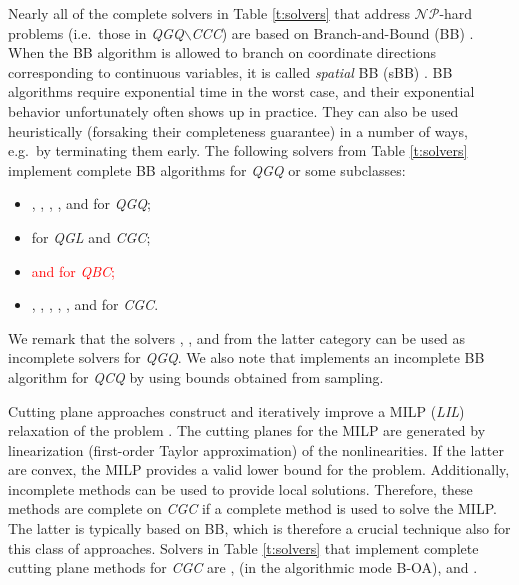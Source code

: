 Nearly all of the complete solvers in Table \ref{t:solvers} that address $\mathcal{NP}$-hard problems (i.e.~those in \textit{QGQ}$\smallsetminus$\textit{CCC}) are based on Branch-and-Bound (BB) \cite{land_doig}. When the BB algorithm is allowed to branch on coordinate directions corresponding to continuous variables, it is called \emph{spatial} BB (sBB) \cite{dakin,BeLeLiMaWa08}. BB algorithms require exponential time in the worst case, and their exponential behavior unfortunately often shows up in practice. They can also be used heuristically (forsaking their completeness guarantee) in a number of ways, e.g.~by terminating them early. The following solvers from Table \ref{t:solvers} implement complete BB algorithms for \textit{QGQ} or some subclasses: 
%
\begin{itemize}
 \item \antigone, \baron, \couenne, \lindo, and \scip for \textit{QGQ};
 \item \cplex for \textit{QGL} and \textit{CGC};
%
 \item \textcolor{red}{\gurobi and \xpress for \textit{QBC};}
%
 \item \bonmin, \gurobi, \knitro, \mosek, \sbb, and \xpress for \textit{CGC}.
\end{itemize}
%
We remark that {the solvers \bonmin, \knitro, and \sbb from} the latter category can be used as incomplete solvers for \textit{QGQ}. We also note that \lgo implements an incomplete BB algorithm for \textit{QCQ} by using bounds obtained from sampling.

Cutting plane approaches construct and iteratively improve a MILP (\textit{LIL}) relaxation of the problem \cite{DuGr86,WePoe02}. The cutting planes for the MILP are generated by linearization (first-order Taylor approximation) of the nonlinearities. If the latter are convex, the MILP provides a valid lower bound for the problem. Additionally, incomplete methods can be used to provide local solutions. Therefore, these methods are complete on \textit{CGC} if a complete method is used to solve the MILP. The latter is typically based on BB, which is therefore a crucial technique also for this class of approaches. Solvers in Table \ref{t:solvers} that implement complete cutting plane methods for \textit{CGC} are \alphaecp, \bonmin (in the algorithmic mode B-OA), and \dicopt.

